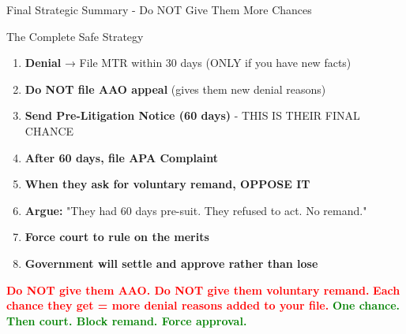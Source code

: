 \documentclass[11pt]{beamer}
\begin{document}
	\begin{frame}{Final Strategic Summary - Do NOT Give Them More Chances}
		\scriptsize
		\begin{block}{The Complete Safe Strategy}
			\begin{enumerate}
				\item \textbf{Denial} → File MTR within 30 days (ONLY if you have new facts)
				\item \textbf{Do NOT file AAO appeal} (gives them new denial reasons)
				\item \textbf{Send Pre-Litigation Notice (60 days)} - THIS IS THEIR FINAL CHANCE
				\item \textbf{After 60 days, file APA Complaint}
				\item \textbf{When they ask for voluntary remand, OPPOSE IT}
				\item \textbf{Argue:} "They had 60 days pre-suit. They refused to act. No remand."
				\item \textbf{Force court to rule on the merits}
				\item \textbf{Government will settle and approve rather than lose}
			\end{enumerate}
			\vspace{0.3cm}
			\textcolor{red}{\textbf{Do NOT give them AAO. Do NOT give them voluntary remand.}}
			\textcolor{red}{\textbf{Each chance they get = more denial reasons added to your file.}}
			\vspace{0.2cm}
			\textcolor{green}{\textbf{One chance. Then court. Block remand. Force approval.}}
		\end{block}
	\end{frame}
	
\end{document}
